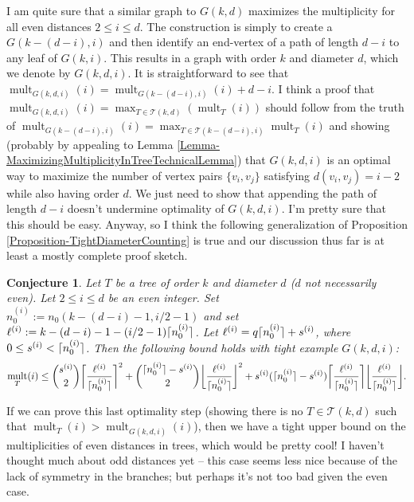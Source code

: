 \documentclass[12]{article}
\DeclarePairedDelimiter\ceil{\lceil}{\rceil}
\DeclareMathOperator{\mult}{mult}
\newtheorem{conj}[thm]{Conjecture}
\theoremstyle{definition}
\begin{document}
	I am quite sure that a similar graph to $G(k,d)$ maximizes the multiplicity for all even distances $2 \leq i \leq d$.  The construction is simply to create a $G(k-(d-i),i)$ and then identify an end-vertex of a path of length $d-i$ to any leaf of $G(k,i)$.  This results in a graph with order $k$ and diameter $d$, which we denote by $G(k,d,i)$.  It is straightforward to see that $\mult_{G(k,d,i)}(i) = \mult_{G(k-(d-i),i)}(i) + d-i$.  I think a proof that $\mult_{G(k,d,i)}(i) = \max_{T \in \mathcal{T}(k,d)}(\mult_T(i))$ should follow from the truth of $\mult_{G(k-(d-i),i)}(i) = \max_{T \in \mathcal{T}(k-(d-i),i)}\mult_T(i)$ and showing (probably by appealing to Lemma \ref{Lemma-MaximizingMultiplicityInTreeTechnicalLemma}) that $G(k,d,i)$ is an optimal way to maximize the number of vertex pairs $\{v_i,v_j\}$ satisfying $d(v_i,v_j) = i-2$ while also having order $d$.  We just need to show that appending the path of length $d-i$ doesn't undermine optimality of $G(k,d,i)$.  I'm pretty sure that this should be easy.  Anyway, so I think the following generalization of Proposition \ref{Proposition-TightDiameterCounting} is true and our discussion thus far is at least a mostly complete proof sketch.
	
	\begin{conj}\label{Conjecture-TightBoundsOnEvenDistanceMultiplicities}
		Let $T$ be a tree of order $k$ and diameter $d$ ($d$ not necessarily even).  Let $2 \leq i \leq d$ be an even integer.  Set $n_0^{(i)} := n_0(k-(d-i)-1,i/2-1)$ and set $\ell^{(i)} := k-(d-i)-1-(i/2-1)\ceil{n_0^{(i)}}$.  Let $\ell^{(i)} = q\ceil{n_0^{(i)}} + s^{(i)}$, where $0 \leq s^{(i)} <\ceil{n_0^{(i)}}$.    Then the following bound holds with tight example $G(k,d,i)$:
		$$\mult_T(i) \leq {s^{(i)} \choose 2}\biggr\lceil{\frac{\ell^{(i)}}{\ceil{n_0^{(i)}}}}\biggr\rceil^2 + {\ceil{n_0^{(i)}}-s^{(i)} \choose 2}\biggr\lfloor{\frac{\ell^{(i)}}{\ceil{n_0^{(i)}}}}\biggr\rfloor^2 + s^{(i)}(\ceil{n_0^{(i)}}-s^{(i)})\biggr\lceil{\frac{\ell^{(i)}}{\ceil{n_0^{(i)}}}}\biggr\rceil \biggr\lfloor{\frac{\ell^{(i)}}{\ceil{n_0^{(i)}}}}\biggr\rfloor.$$
	\end{conj}
	
	If we can prove this last optimality step (showing there is no $T \in \mathcal{T}(k,d)$ such that $\mult_T(i) > \mult_{G(k,d,i)}(i)$), then we have a tight upper bound on the multiplicities of even distances in trees, which would be pretty cool!  I haven't thought much about odd distances yet -- this case seems less nice because of the lack of symmetry in the branches; but perhaps it's not too bad given the even case.  
	
\end{document}
